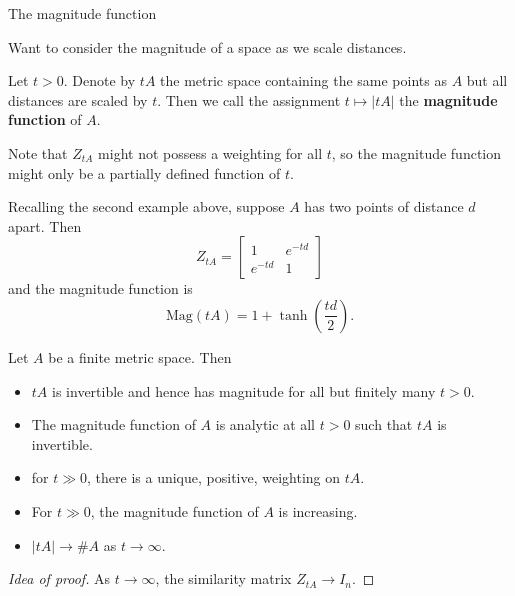 \documentclass[12pt,mathserif]{beamer}
\begin{document}
\begin{frame}[allowframebreaks]{The magnitude function}

Want to consider the magnitude of a space as we scale distances.

\begin{definition}
Let $t > 0$. Denote by $tA$ the metric space containing the same points as $A$ but all distances are scaled by $t$. Then we call the assignment $t\mapsto\vert tA\vert$ the \textbf{magnitude function} of $A$.
\end{definition}

Note that $Z_{tA}$ might not possess a weighting for all $t$, so the magnitude function might only be a partially defined function of $t$.

\framebreak

\begin{example}
Recalling the second example above, suppose $A$ has two points of distance $d$ apart. Then
\begin{equation*}
Z_{tA} = \begin{bmatrix} 1 & e^{-td} \\ e^{-td} & 1 \end{bmatrix}
\end{equation*}
and the magnitude function is
\begin{equation*}
\text{Mag}(tA) = 1 + \tanh\left(\frac{td}{2}\right).
\end{equation*}
\end{example}

\begin{theorem}
Let $A$ be a finite metric space. Then
\begin{itemize}
\item $tA$ is invertible and hence has magnitude for all but finitely many $t > 0$.
\item The magnitude function of $A$ is analytic at all $t>0$ such that $tA$ is invertible.
\item for $t \gg 0$, there is a unique, positive, weighting on $tA$.
\item For $t \gg 0$, the magnitude function of $A$ is increasing.
\item $\vert tA \vert \to \#A$ as $t \to \infty$.
\end{itemize}
\end{theorem}

\begin{proof}[Idea of proof]\renewcommand{\qedsymbol}{}
As $t\to\infty$, the similarity matrix $Z_{tA} \to I_n$.
\end{proof}


\end{frame}
\end{document}
